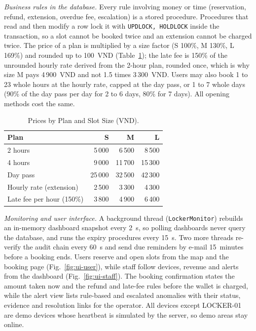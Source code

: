 \documentclass[journal,onecolumn]{IEEEtran}
\begin{document}
\textit{Business rules in the database.} Every rule involving money or time (reservation, refund, extension,
overdue fee, escalation) is a stored procedure. Procedures that read and then modify a row lock it with
\texttt{UPDLOCK, HOLDLOCK} inside the transaction, so a slot cannot be booked twice and an extension cannot be charged
twice. The price of a plan is multiplied by a size factor (S 100\%, M 130\%, L 169\%) and rounded up to 100~VND
(Table~\ref{tab:price}); the late fee is 150\% of the unrounded hourly rate derived from the 2-hour plan, rounded once,
which is why size M pays 4\,900~VND and not 1.5 times 3\,300~VND. Users may also book 1 to 23 whole hours at the hourly
rate, capped at the day pass, or 1 to 7 whole days (90\% of the day pass per day for 2 to 6 days, 80\% for 7 days).
All opening methods cost the same.

\begin{table}[!htbp]
\renewcommand{\arraystretch}{1.02}
\centering
\small
\caption{Prices by Plan and Slot Size (VND).}
\label{tab:price}
\vspace{5pt}
\begin{tabular}{l r r r}
\hline
Plan & S & M & L \\
\hline
2 hours & 5\,000 & 6\,500 & 8\,500 \\
4 hours & 9\,000 & 11\,700 & 15\,300 \\
Day pass & 25\,000 & 32\,500 & 42\,300 \\
Hourly rate (extension) & 2\,500 & 3\,300 & 4\,300 \\
Late fee per hour (150\%) & 3\,800 & 4\,900 & 6\,400 \\
\hline
\end{tabular}
\end{table}

\textit{Monitoring and user interface.} A background thread (\texttt{LockerMonitor}) rebuilds an in-memory dashboard
snapshot every 2~s, so polling dashboards never query the database, and runs the expiry procedures every 15~s. Two more
threads re-verify the audit chain every 60~s and send due reminders by e-mail 15~minutes before a booking ends. Users
reserve and open slots from the map and the booking page (Fig.~\ref{fig:ui-user}), while staff follow devices, revenue
and alerts from the dashboard (Fig.~\ref{fig:ui-staff}). The booking confirmation states the amount taken now and the
refund and late-fee rules before the wallet is charged, while the alert view lists rule-based and escalated anomalies
with their status, evidence and resolution links for the operator. All devices except LOCKER-01 are demo devices whose
heartbeat is simulated by the server, so demo areas stay online.
\end{document}
